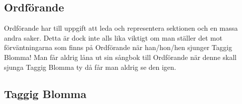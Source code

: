 











\subsection*{Ordförande}
Ordförande har till uppgift att leda och representera sektionen och en massa andra saker. 
Detta är dock inte alls lika viktigt om man ställer det mot förväntningarna som finns på Ordförande när han/hon/hen sjunger Taggig Blomma! 
Man får aldrig låna ut sin sångbok till Ordförande när denne skall sjunga Taggig Blomma ty då får man aldrig se den igen.
\\

\vspace{1cm}

\subsection*{Taggig Blomma} 


